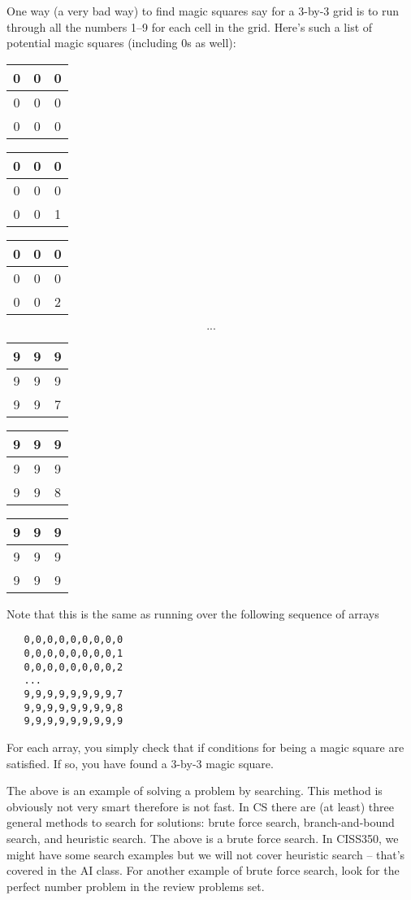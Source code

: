 One way (a very bad way) to find magic squares say for a 3-by-3 grid
is to run through all the numbers 1--9 for each cell in the grid.
Here's such a list of potential magic squares (including 0s as well):
\begin{longtable}{|c|c|c|}
\hline
0 & 0 & 0 \\ \hline
0 & 0 & 0 \\ \hline
0 & 0 & 0 \\ \hline
\end{longtable}
\begin{longtable}{|c|c|c|}
\hline
0 & 0 & 0 \\ \hline
0 & 0 & 0 \\ \hline
0 & 0 & 1 \\ \hline
\end{longtable}
\begin{longtable}{|c|c|c|}
\hline
0 & 0 & 0 \\ \hline
0 & 0 & 0 \\ \hline
0 & 0 & 2 \\ \hline
\end{longtable}
\[ ... \]
\begin{longtable}{|c|c|c|}
\hline
9 & 9 & 9 \\ \hline
9 & 9 & 9 \\ \hline
9 & 9 & 7 \\ \hline
\end{longtable}
\begin{longtable}{|c|c|c|}
\hline
9 & 9 & 9 \\ \hline
9 & 9 & 9 \\ \hline
9 & 9 & 8 \\ \hline
\end{longtable}
\begin{longtable}{|c|c|c|}
\hline
9 & 9 & 9 \\ \hline
9 & 9 & 9 \\ \hline
9 & 9 & 9 \\ \hline
\end{longtable}
Note that this 
is the same as running over the following sequence of arrays
\begin{verbatim}
   0,0,0,0,0,0,0,0,0
   0,0,0,0,0,0,0,0,1
   0,0,0,0,0,0,0,0,2
   ...
   9,9,9,9,9,9,9,9,7
   9,9,9,9,9,9,9,9,8
   9,9,9,9,9,9,9,9,9
\end{verbatim}
For each array, you simply check that if conditions for being a magic 
square are satisfied. If so, you have found a 3-by-3 magic square.

The above is an example
of solving a problem by searching.
This method is obviously not very smart therefore is not fast.
In CS there are (at least) three general methods to search for solutions:
brute force search, branch-and-bound search, and heuristic search.
The above is a brute force search.
In CISS350, we might have some search
examples but we will not cover heuristic search -- that's covered in 
the AI class.
For another example of brute force search, look for the perfect number 
problem in the review problems set.

